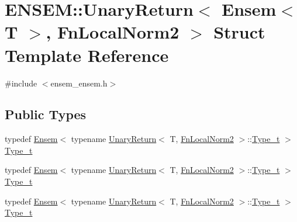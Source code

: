 \hypertarget{structENSEM_1_1UnaryReturn_3_01Ensem_3_01T_01_4_00_01FnLocalNorm2_01_4}{}\section{E\+N\+S\+EM\+:\+:Unary\+Return$<$ Ensem$<$ T $>$, Fn\+Local\+Norm2 $>$ Struct Template Reference}
\label{structENSEM_1_1UnaryReturn_3_01Ensem_3_01T_01_4_00_01FnLocalNorm2_01_4}


{\ttfamily \#include $<$ensem\+\_\+ensem.\+h$>$}

\subsection*{Public Types}
\begin{DoxyCompactItemize}
\item 
typedef \mbox{\hyperlink{classENSEM_1_1Ensem}{Ensem}}$<$ typename \mbox{\hyperlink{structENSEM_1_1UnaryReturn}{Unary\+Return}}$<$ T, \mbox{\hyperlink{structENSEM_1_1FnLocalNorm2}{Fn\+Local\+Norm2}} $>$\+::\mbox{\hyperlink{structENSEM_1_1UnaryReturn_3_01Ensem_3_01T_01_4_00_01FnLocalNorm2_01_4_a683bc7aab1651cd6ec3d3ccb81a0df5f}{Type\+\_\+t}} $>$ \mbox{\hyperlink{structENSEM_1_1UnaryReturn_3_01Ensem_3_01T_01_4_00_01FnLocalNorm2_01_4_a683bc7aab1651cd6ec3d3ccb81a0df5f}{Type\+\_\+t}}
\item 
typedef \mbox{\hyperlink{classENSEM_1_1Ensem}{Ensem}}$<$ typename \mbox{\hyperlink{structENSEM_1_1UnaryReturn}{Unary\+Return}}$<$ T, \mbox{\hyperlink{structENSEM_1_1FnLocalNorm2}{Fn\+Local\+Norm2}} $>$\+::\mbox{\hyperlink{structENSEM_1_1UnaryReturn_3_01Ensem_3_01T_01_4_00_01FnLocalNorm2_01_4_a683bc7aab1651cd6ec3d3ccb81a0df5f}{Type\+\_\+t}} $>$ \mbox{\hyperlink{structENSEM_1_1UnaryReturn_3_01Ensem_3_01T_01_4_00_01FnLocalNorm2_01_4_a683bc7aab1651cd6ec3d3ccb81a0df5f}{Type\+\_\+t}}
\item 
typedef \mbox{\hyperlink{classENSEM_1_1Ensem}{Ensem}}$<$ typename \mbox{\hyperlink{structENSEM_1_1UnaryReturn}{Unary\+Return}}$<$ T, \mbox{\hyperlink{structENSEM_1_1FnLocalNorm2}{Fn\+Local\+Norm2}} $>$\+::\mbox{\hyperlink{structENSEM_1_1UnaryReturn_3_01Ensem_3_01T_01_4_00_01FnLocalNorm2_01_4_a683bc7aab1651cd6ec3d3ccb81a0df5f}{Type\+\_\+t}} $>$ \mbox{\hyperlink{structENSEM_1_1UnaryReturn_3_01Ensem_3_01T_01_4_00_01FnLocalNorm2_01_4_a683bc7aab1651cd6ec3d3ccb81a0df5f}{Type\+\_\+t}}
\end{DoxyCompactItemize}


